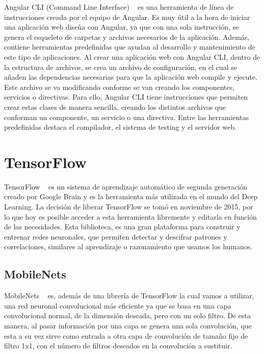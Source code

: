 \documentclass[a4paper, 12pt]{book}
\begin{document}
Angular CLI (Command Line Interface) ~\cite{articulobayes} es una herramienta de línea de instrucciones creada por el equipo de Angular. Es muy útil a la hora de iniciar una aplicación web diseña con Angular, ya que con una sola instrucción, se genera el esqueleto de carpetas y archivos necesarios de la aplicación. Además, contiene herramientas predefinidas que ayudan al desarrollo y mantenimiento de este tipo de aplicaciones. Al crear una aplicación web con Angular CLI, dentro de la estructura de archivos, se crea un archivo de configuración, en el cual se añaden las dependencias necesarias para que la aplicación web compile y ejecute. Este archivo se va modificando conforme se van creando los componentes, servicios o directivas. Para ello, Angular CLI tiene instrucciones que permiten crear estas clases de manera sencilla, creando los distintos archivos que conforman un componente, un servicio o una directiva. Entre las herramientas predefinidas destaca el compilador, el sistema de testing y el servidor web.

\section{TensorFlow} 
\label{sec:tensorflow}

TensorFlow ~\cite{tensorflow} es un sistema de aprendizaje automático de segunda generación creado por Google Brain y es la herramienta más utilizada en el mundo del Deep Learning. La decisión de liberar TensorFlow se tomó en noviembre de 2015, por lo que hoy es posible acceder a esta herramienta libremente y editarla en función de las necesidades. Esta biblioteca, es una gran plataforma para construir y entrenar redes neuronales, que permiten detectar y descifrar patrones y correlaciones, similares al aprendizaje o razonamiento que usamos los humanos. 

\subsection{MobileNets} 
\label{sec:mobilenets}

MobileNets ~\cite{mobilenets} es, además de una librería de TensorFlow la cual vamos a utilizar, una red neuronal convolucional más eficiente ya que se basa en una capa convolucional normal, de la dimensión deseada, pero con un solo filtro. De esta manera, al pasar información por una capa se genera una sola convolución, que esta a su vez sirve como entrada a otra capa de convolución de tamaño fijo de filtro 1x1, con el número de filtros deseados en la convolución a sustituir.
\end{document}
